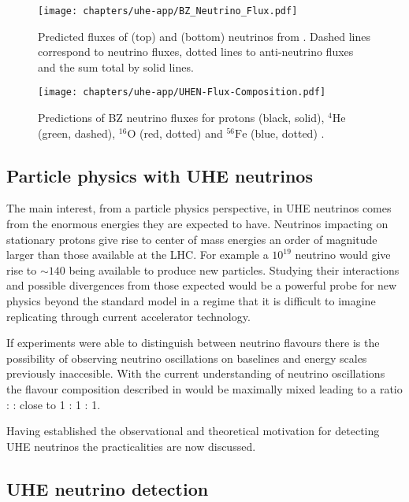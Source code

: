 \begin{figure}[htpb]
  \centering
  \texttt{[image: chapters/uhe-app/BZ\_Neutrino\_Flux.pdf]}
  \caption{Predicted fluxes of \Pnue (top) and \Pnum (bottom) neutrinos from \cite{PhysRevD.64.093010}. Dashed lines correspond to neutrino fluxes, dotted lines to anti-neutrino fluxes and the sum total by solid lines.}
  \label{fig:uhe-app:UHEN:UHEN-Flux}
\end{figure}

\begin{figure}[htpb]
  \centering
  \texttt{[image: chapters/uhe-app/UHEN-Flux-Composition.pdf]}
  \label{fig:uhe-app:UHEN:UHEN-Flux-Composition-Models}
  \caption{Predictions of BZ neutrino fluxes for protons (black, solid), $^4\mbox{He}$ (green, dashed), $^16 \mbox{O}$ (red, dotted) and $^56\mbox{Fe}$ (blue, dotted) \cite{Hooper200511}.}
\end{figure}

\subsection{Particle physics with UHE neutrinos}
\label{sec:uhe-app:UHEN:particle-physics}

The main interest, from a particle physics perspective, in UHE neutrinos comes from the enormous energies they are expected to have. Neutrinos impacting on stationary protons give rise to center of mass energies an order of magnitude larger than those available at the LHC. For example a $10^{19}$ \eV neutrino would give rise to $\sim 140$ \TeV being available to produce new particles. Studying their interactions and possible divergences from those expected would be a powerful probe for new physics beyond the standard model in a regime that it is difficult to imagine replicating through current accelerator technology.

If experiments were able to distinguish between neutrino flavours there is the possibility of observing neutrino oscillations on baselines and energy scales previously inaccesible. With the current understanding of neutrino oscillations the flavour composition described in  would be maximally mixed leading to a ratio \Pnue : \Pnum : \Pnut close to 1 : 1 : 1.

Having established the observational and theoretical motivation for detecting UHE neutrinos the practicalities are now discussed.

\subsection{UHE neutrino detection}
\label{sec:uhe-app:UHEN:detection}

